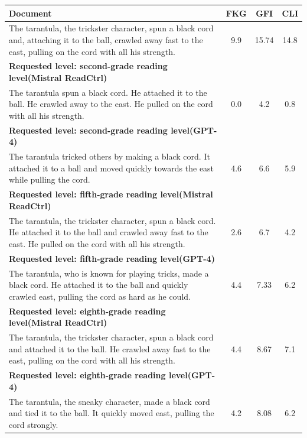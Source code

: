 \documentclass[11pt]{article}
\begin{document}
{\begin{table}
    \centering
    \begin{tabular}{>{\raggedright\arraybackslash}p{11cm} c c c}
        \toprule
        \textbf{Document} & \textbf{FKG} & \textbf{GFI}& \textbf{CLI} \\
        \midrule
The tarantula, the trickster character, spun a black cord and, attaching it to the ball, crawled away fast to the east, pulling on the cord with all his strength. & 9.9 & 15.74 & 14.8 \\
        \midrule
        \textbf{Requested level: second-grade reading level(Mistral ReadCtrl)} \\
        The tarantula spun a black cord. He attached it to the ball. He crawled away to the east. He pulled on the cord with all his strength. & 0.0 & 4.2 & 0.8 \\
        \textbf{Requested level: second-grade reading level(GPT-4)} \\
        The tarantula tricked others by making a black cord. It attached it to a ball and moved quickly towards the east while pulling the cord. & 4.6 & 6.6 & 5.9 \\

        \midrule
        
        \textbf{Requested level: fifth-grade reading level(Mistral ReadCtrl)} \\
        The tarantula, the trickster character, spun a black cord. He attached it to the ball and crawled away fast to the east. He pulled on the cord with all his strength. & 2.6 & 6.7 & 4.2 \\
        \textbf{Requested level: fifth-grade reading level(GPT-4)} \\
        The tarantula, who is known for playing tricks, made a black cord. He attached it to the ball and quickly crawled east, pulling the cord as hard as he could. & 4.4 & 7.33 & 6.2 \\

        \midrule
        
        \textbf{Requested level: eighth-grade reading level(Mistral ReadCtrl)} \\
        The tarantula, the trickster character, spun a black cord and attached it to the ball. He crawled away fast to the east, pulling on the cord with all his strength. & 4.4 & 8.67 & 7.1 \\

         \textbf{Requested level: eighth-grade reading level(GPT-4)} \\
         The tarantula, the sneaky character, made a black cord and tied it to the ball. It quickly moved east, pulling the cord strongly. & 4.2 & 8.08 & 6.2 \\


\end{tabular}
\end{table}}
\end{document}
